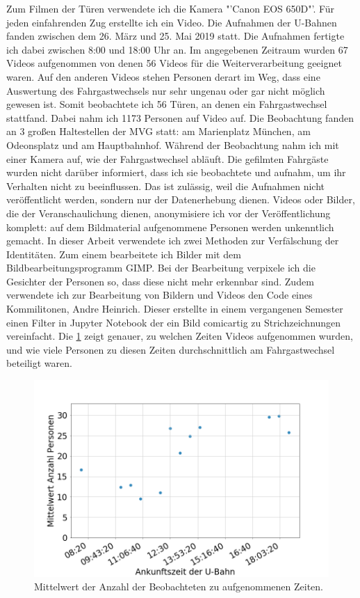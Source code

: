 Zum Filmen der Türen verwendete ich die Kamera "'Canon EOS 650D"'. Für jeden einfahrenden Zug erstellte ich ein Video. Die Aufnahmen der U-Bahnen fanden zwischen dem 26. März und 25. Mai 2019 statt. Die Aufnahmen fertigte ich dabei zwischen 8:00 und 18:00 Uhr an. Im angegebenen Zeitraum wurden 67 Videos aufgenommen von denen 56 Videos für die Weiterverarbeitung geeignet waren. Auf den anderen Videos stehen Personen derart im Weg, dass eine Auswertung des Fahrgastwechsels nur sehr ungenau oder gar nicht möglich gewesen ist. Somit beobachtete ich 56 Türen, an denen ein Fahrgastwechsel stattfand. Dabei nahm ich 1173 Personen auf Video auf. Die Beobachtung fanden an 3 großen Haltestellen der MVG statt: am Marienplatz München, am Odeonsplatz und am Hauptbahnhof. Während der Beobachtung nahm ich mit einer Kamera auf, wie der Fahrgastwechsel abläuft. Die gefilmten Fahrgäste wurden nicht darüber informiert, dass ich sie beobachtete und aufnahm, um ihr Verhalten nicht zu beeinflussen. Das ist zulässig, weil die Aufnahmen nicht veröffentlicht werden, sondern nur der Datenerhebung dienen. Videos oder Bilder, die der Veranschaulichung dienen, anonymisiere ich vor der Veröffentlichung komplett: auf dem Bildmaterial aufgenommene Personen werden unkenntlich gemacht. In dieser Arbeit verwendete ich zwei Methoden zur Verfälschung der Identitäten. Zum einem bearbeitete ich Bilder mit dem Bildbearbeitungsprogramm \textsf{GIMP}. Bei der Bearbeitung verpixele ich die Gesichter der Personen so, dass diese nicht mehr erkennbar sind. Zudem verwendete ich zur Bearbeitung von Bildern und Videos den Code eines Kommilitonen, Andre Heinrich. Dieser erstellte in einem vergangenen Semester einen Filter in \textsf{Jupyter Notebook} der ein Bild comicartig zu Strichzeichnungen vereinfacht.
Die \figurename \ref{fig:PersonenUberZeit} zeigt genauer, zu welchen Zeiten Videos aufgenommen wurden, und wie viele Personen zu diesen Zeiten durchschnittlich am Fahrgastwechsel beteiligt waren.
\begin{figure}[H]
	\centering
		\includegraphics[width=1.0\textwidth]{pictures/observation/recording/peopleOverTime.png}
	\caption{Mittelwert der Anzahl der Beobachteten zu aufgenommenen Zeiten.}
	\label{fig:PersonenUberZeit}
\end{figure}
